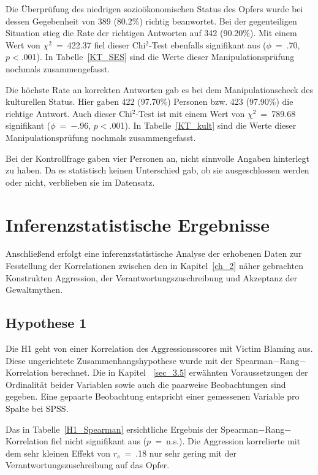 Die Überprüfung des niedrigen sozioökonomischen Status des Opfers wurde bei dessen Gegebenheit von 389 (80.2\%) richtig beanwortet. Bei der gegenteiligen Situation stieg die Rate der richtigen Antworten auf 342 (90.20\%). Mit einem Wert von $\chi^2$~=~422.37 fiel dieser Chi$^2$-Test ebenfalls signifikant aus ($\phi$~=~.70, $p<$.001). 
In Tabelle~\ref{KT_SES} sind die Werte dieser Manipulationsprüfung nochmals zusammengefasst.



Die höchste Rate an korrekten Antworten gab es bei dem Manipulationscheck des kulturellen Status. Hier gaben 422 (97.70\%) Personen bzw. 423 (97.90\%) die richtige Antwort. Auch dieser Chi$^2$-Test ist mit einem Wert von $\chi^2$~=~789.68 signifikant ($\phi$~=~$-$.96, $p<$.001). 
In Tabelle~\ref{KT_kult} sind die Werte dieser Manipulationsprüfung nochmals zusammengefasst.

Bei der Kontrollfrage gaben vier Personen an, nicht sinnvolle Angaben hinterlegt zu haben. Da es statistisch keinen Unterschied gab, ob sie ausgeschlossen werden oder nicht, verblieben sie im Datensatz.



\section{Inferenzstatistische Ergebnisse}    \label{sec_4.3}
Anschließend erfolgt eine inferenzstatistische Analyse der erhobenen Daten zur Fesstellung der Korrelationen zwischen den in Kapitel~\ref{ch_2} näher gebrachten Konstrukten Aggression, der Verantwortungszuschreibung und Akzeptanz der Gewaltmythen. 


\subsection{Hypothese 1}    \label{subsec_4.3.1}
Die H1 geht von einer Korrelation des Aggressionsscores mit Victim Blaming aus. Diese ungerichtete Zusammenhangshypothese wurde mit der Spearman$-$Rang$-$Korrelation berechnet. Die in Kapitel ~\ref{sec_3.5} erwähnten Voraussetzungen der Ordinalität beider Variablen sowie auch die paarweise Beobachtungen sind gegeben. Eine gepaarte Beobachtung entspricht einer gemessenen Variable pro Spalte bei SPSS\textsuperscript{\textregistered}.


Das in Tabelle~\ref{H1_Spearman} ersichtliche Ergebnis der Spearman$-$Rang$-$Korrelation fiel nicht signifikant aus ($p$~=~n.s.). Die Aggression korrelierte mit dem sehr kleinen Effekt \parencite{Cohen_1992} von $r_{s}$~=~.18 nur sehr gering mit der Verantwortungszuschreibung auf das Opfer.

